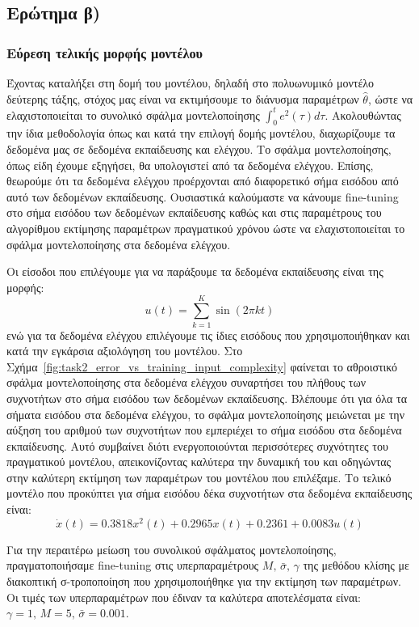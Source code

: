 \documentclass[a4paper,12pt]{article}
\begin{document}
\subsection*{Ερώτημα β)}
\subsubsection*{Εύρεση τελικής μορφής μοντέλου}
Έχοντας καταλήξει στη δομή του μοντέλου, δηλαδή στο πολυωνυμικό μοντέλο δεύτερης τάξης, στόχος μας είναι
να εκτιμήσουμε το διάνυσμα παραμέτρων $\hat{\theta}$, ώστε να ελαχιστοποιείται το συνολικό σφάλμα 
μοντελοποίησης $\int_0^t e^2(\tau)d\tau$. Ακολουθώντας την ίδια μεθοδολογία όπως και κατά την επιλογή δομής
μοντέλου, διαχωρίζουμε τα δεδομένα μας σε δεδομένα εκπαίδευσης και ελέγχου. Το σφάλμα μοντελοποίησης, όπως
είδη έχουμε εξηγήσει, θα υπολογιστεί από τα δεδομένα ελέγχου. Επίσης, θεωρούμε ότι τα δεδομένα ελέγχου
προέρχονται από διαφορετικό σήμα εισόδου από αυτό των δεδομένων εκπαίδευσης. Ουσιαστικά καλούμαστε να
κάνουμε fine-tuning στο σήμα εισόδου των δεδομένων εκπαίδευσης
καθώς και στις παραμέτρους του αλγορίθμου εκτίμησης παραμέτρων πραγματικού χρόνου ώστε να ελαχιστοποιείται
το σφάλμα μοντελοποίησης στα δεδομένα ελέγχου.

Οι είσοδοι που επιλέγουμε για να παράξουμε τα δεδομένα εκπαίδευσης είναι της μορφής:
\[
    u(t) = \sum_{k=1}^K \sin(2 \pi kt)
\]
ενώ για τα δεδομένα ελέγχου επιλέγουμε τις ίδιες εισόδους που χρησιμοποιήθηκαν και κατά την εγκάρσια
αξιολόγηση του μοντέλου. Στο Σχήμα~\ref{fig:task2_error_vs_training_input_complexity} φαίνεται το αθροιστικό 
σφάλμα μοντελοποίησης στα δεδομένα ελέγχου συναρτήσει του πλήθους των συχνοτήτων στο σήμα εισόδου των δεδομένων 
εκπαίδευσης. Βλέπουμε ότι για όλα τα σήματα εισόδου στα δεδομένα ελέγχου, το σφάλμα μοντελοποίησης μειώνεται με
την αύξηση του αριθμού των συχνοτήτων που εμπεριέχει το σήμα εισόδου στα δεδομένα εκπαίδευσης. Αυτό συμβαίνει
διότι ενεργοποιούνται περισσότερες συχνότητες του πραγματικού μοντέλου, απεικονίζοντας καλύτερα την δυναμική
του και οδηγώντας στην καλύτερη εκτίμηση των παραμέτρων του μοντέλου που επιλέξαμε. Το τελικό μοντέλο
που προκύπτει για σήμα εισόδου δέκα συχνοτήτων στα δεδομένα εκπαίδευσης είναι:
\begin{equation}
    \dot{x}(t) = 0.3818 x^2(t) + 0.2965 x(t) + 0.2361 + 0.0083 u(t)
    \label{eq:final_model}
\end{equation}

Για την περαιτέρω μείωση του συνολικού σφάλματος μοντελοποίησης, πραγματοποιήσαμε 
fine-tuning στις υπερπαραμέτρους 
$M, \, \bar{\sigma}, \, \gamma$ της μεθόδου κλίσης με διακοπτική σ-τροποποίηση που χρησιμοποιήθηκε  
για την εκτίμηση των παραμέτρων. Οι τιμές των υπερπαραμέτρων που έδιναν τα καλύτερα αποτελέσματα
είναι: $\gamma = 1, \, M = 5, \, \bar{\sigma}  = 0.001$.
\end{document}
